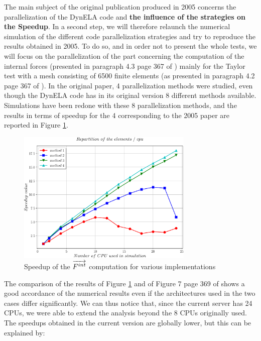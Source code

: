 \documentclass{article}
\begin{document}
The main subject of the original publication produced in 2005 concerns the parallelization of the DynELA code and \textbf{the influence of the strategies on the Speedup}. In a second step, we will therefore relaunch the numerical simulation of the different code parallelization strategies and try to reproduce the results obtained in 2005. To do so, and in order not to present the whole tests, we will focus on the parallelization of the part concerning the computation of the internal forces (presented in paragraph 4.3 page 367 of \cite{Pantale:2005}) mainly for the Taylor test with a mesh consisting of 6500 finite elements (as presented in paragraph 4.2 page 367 of \cite{Pantale:2005}). In the original paper, 4 parallelization methods were studied, even though the DynELA code has in its original version 8 different methods available. Simulations have been redone with these 8 parallelization methods, and the results in terms of speedup for the 4 corresponding to the 2005 paper are reported in Figure \ref{speedup}.
\begin{figure}[h!] 
  \centering
  \includegraphics[width=0.75\textwidth]{./speedup.pdf}
  \caption{Speedup of the $\protect\overrightarrow{F^{int}}$ computation for various implementations}
  \label{speedup}
\end{figure}
The comparison of the results of Figure \ref{speedup} and of Figure 7 page 369 of \cite{Pantale:2005} shows a good accordance of the numerical results even if the architectures used in the two cases differ significantly. We can thus notice that, since the current server has 24 CPUs, we were able to extend the analysis beyond the 8 CPUs originally used. The speedups obtained in the current version are globally lower, but this can be explained by:
\end{document}
